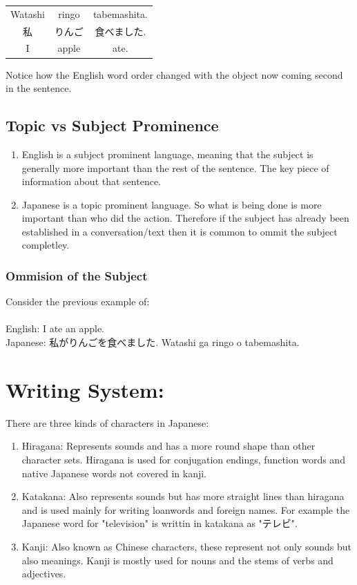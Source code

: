 \documentclass[12pt, letterpaper]{report}
\begin{document}
\begin{center}
\begin{tabular}{|c|c|c|} 
 \hline
 Watashi & ringo & tabemashita. \\ 
 私 & りんご & 食べました. \\ 
 I & apple & ate.\\ 
 \hline
\end{tabular}
		\end{center}
		Notice how the English word order changed with the object now coming 
		second in the sentence.

\section{Topic vs Subject Prominence}
\begin{enumerate}
	\item English is a subject prominent language, meaning that the subject is 
		generally more important than the rest of the sentence. The key piece
		of information about that sentence.
	\item Japanese is a topic prominent language. So what is being done is more
		important than who did the action. Therefore if the subject has already
		been established in a conversation/text then it is common to ommit the
		subject completley.
\end{enumerate}

\subsection{Ommision of the Subject}
Consider the previous example of:\\\\
English: I ate an apple.\\
Japanese: 私がりんごを食べました. Watashi ga ringo o tabemashita.

\chapter{Writing System:}
There are three kinds of characters in Japanese:
\begin{enumerate}
	\item Hiragana: Represents sounds and has a more round shape than other character sets.
		Hiragana is used for conjugation endings, function words and native Japanese words
		not covered in kanji.
	\item Katakana: Also represents sounds but has more straight lines than hiragana and is
		used mainly for writing loanwords and foreign names. For example the Japanese word
		for "television" is writtin in katakana as "テレビ". 
	\item Kanji: Also known as Chinese characters, these represent not only sounds but also
		meanings. Kanji is mostly used for nouns and the stems of verbs and adjectives.
\end{enumerate}
\end{document}
